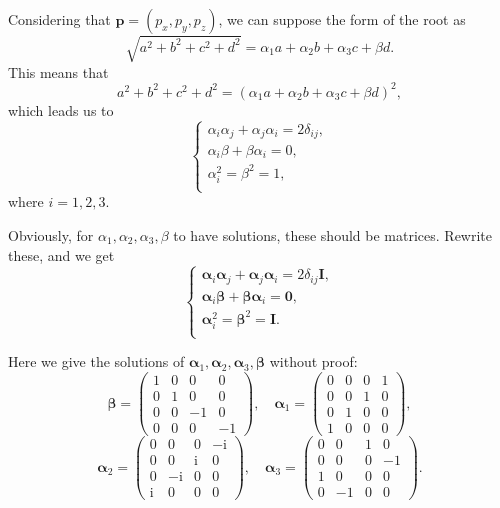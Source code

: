 Considering that \(\boldsymbol{p} = (p_x, p_y, p_z)\), we can suppose
the form of the root as
\[\sqrt{a^2 + b^2 + c^2 + d^2} = \alpha_1 a + \alpha_2 b + \alpha_3 c + \beta d.\]
This means that
\[a^2 + b^2 + c^2 + d^2 = \left( \alpha_1 a + \alpha_2 b + \alpha_3 c + \beta d \right)^2,\]
which leads us to \[\left\{
    \begin{array}{l}
        \alpha_i \alpha_j + \alpha_j \alpha_i = 2 \delta_{ij}, \\
        \alpha_i\beta + \beta\alpha_i = 0, \\
        \alpha_i^2 = \beta^2 = 1, \\
    \end{array}
\right.\] where \(i = 1, 2, 3\).

Obviously, for \(\alpha_1, \alpha_2, \alpha_3, \beta\) to have
solutions, these should be matrices. Rewrite these, and we get \[\left\{
    \begin{array}{l}
        \boldsymbol{\alpha}_i \boldsymbol{\alpha}_j + \boldsymbol{\alpha}_j \boldsymbol{\alpha}_i = 2 \delta_{ij} \mathbf{I}, \\
        \boldsymbol{\alpha}_i \boldsymbol{\beta} + \boldsymbol{\beta} \boldsymbol{\alpha}_i = \mathbf{0}, \\
        \boldsymbol{\alpha}_i^2 = \boldsymbol{\beta}^2 = \mathbf{I}. \\
    \end{array}
\right.\]

Here we give the solutions of
\(\boldsymbol{\alpha}_1, \boldsymbol{\alpha}_2, \boldsymbol{\alpha}_3, \boldsymbol{\beta}\)
without proof:
\[\boldsymbol{\beta} = \begin{pmatrix} 1 & 0 & 0 & 0 \\ 0 & 1 & 0 & 0 \\ 0 & 0 & -1 & 0 \\ 0 & 0 & 0 & -1 \end{pmatrix}, \quad \boldsymbol{\alpha}_1 = \begin{pmatrix} 0 & 0 & 0 & 1 \\ 0 & 0 & 1 & 0 \\ 0 & 1 & 0 & 0 \\ 1 & 0 & 0 & 0 \end{pmatrix},\]
\[\boldsymbol{\alpha}_2 = \begin{pmatrix} 0 & 0 & 0 & - \mathrm{i} \\ 0 & 0 & \mathrm{i} & 0 \\ 0 & - \mathrm{i}& 0 & 0 \\ \mathrm{i} & 0 & 0 & 0 \end{pmatrix}, \quad \boldsymbol{\alpha}_3 = \begin{pmatrix} 0 & 0 & 1 & 0 \\ 0 & 0 & 0 & -1 \\ 1 & 0 & 0 & 0 \\ 0 & -1 & 0 & 0 \end{pmatrix}.\]

